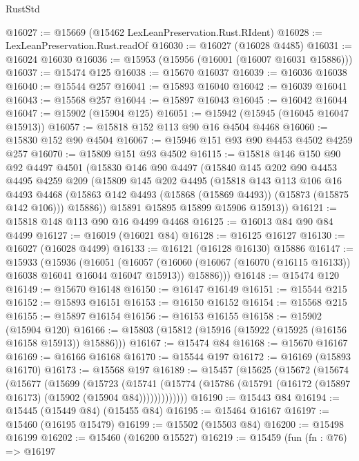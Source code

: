 \begin{lexlean}{RustStd}
\begin{coremodule}
@16027 := @15669 (@15462 LexLeanPreservation.Rust.RIdent)
@16028 := LexLeanPreservation.Rust.readOf
@16030 := @16027 (@16028 @4485)
@16031 := @16024 @16030
@16036 := @15953 (@15956 (@16001 (@16007 @16031 @15886)))
@16037 := @15474 @125
@16038 := @15670 @16037
@16039 := @16036 @16038
@16040 := @15544 @257
@16041 := @15893 @16040
@16042 := @16039 @16041
@16043 := @15568 @257
@16044 := @15897 @16043
@16045 := @16042 @16044
@16047 := @15902 (@15904 @125)
@16051 := @15942 (@15945 (@16045 @16047 @15913))
@16057 := @15818 @152 @113 @90 @16 @4504 @4468
@16060 := @15830 @152 @90 @4504
@16067 := @15946 @151 @93 @90 @4453 @4502 @4259 @257
@16070 := @15809 @151 @93 @4502
@16115 := @15818
    @146
    @150
    @90
    @92
    @4497
    @4501
    (@15830
      @146
      @90
      @4497
      (@15840
        @145
        @202
        @90
        @4453
        @4495
        @4259
        @209
        (@15809
          @145
          @202
          @4495
          (@15818
            @143
            @113
            @106
            @16
            @4493
            @4468
            (@15863 @142 @4493 (@15868 (@15869 @4493)) (@15873 (@15875 @142 @106)))
            @15886))
        @15891
        @15895
        @15899
        @15906
        @15913))
@16121 := @15818 @148 @113 @90 @16 @4499 @4468
@16125 := @16013 @84 @90 @84 @4499
@16127 := @16019 (@16021 @84)
@16128 := @16125 @16127
@16130 := @16027 (@16028 @4499)
@16133 := @16121 (@16128 @16130) @15886
@16147 := @15933
    (@15936
      (@16051
        (@16057
          (@16060 (@16067 (@16070 (@16115 @16133)) @16038 @16041 @16044 @16047 @15913))
          @15886)))
@16148 := @15474 @120
@16149 := @15670 @16148
@16150 := @16147 @16149
@16151 := @15544 @215
@16152 := @15893 @16151
@16153 := @16150 @16152
@16154 := @15568 @215
@16155 := @15897 @16154
@16156 := @16153 @16155
@16158 := @15902 (@15904 @120)
@16166 := @15803 (@15812 (@15916 (@15922 (@15925 (@16156 @16158 @15913)) @15886)))
@16167 := @15474 @84
@16168 := @15670 @16167
@16169 := @16166 @16168
@16170 := @15544 @197
@16172 := @16169 (@15893 @16170)
@16173 := @15568 @197
@16189 := @15457
    (@15625
      (@15672
        (@15674
          (@15677
            (@15699
              (@15723
                (@15741
                  (@15774 (@15786 (@15791 (@16172 (@15897 @16173) (@15902 (@15904 @84)))))))))))))
@16190 := @15443 @84
@16194 := @15445 (@15449 @84) (@15455 @84)
@16195 := @15464 @16167
@16197 := @15460 (@16195 @15479)
@16199 := @15502 (@15503 @84)
@16200 := @15498 @16199
@16202 := @15460 (@16200 @15527)
@16219 := @15459
    (fun (fn : @76) =>
    @16197

\end{coremodule}
\end{lexlean}
